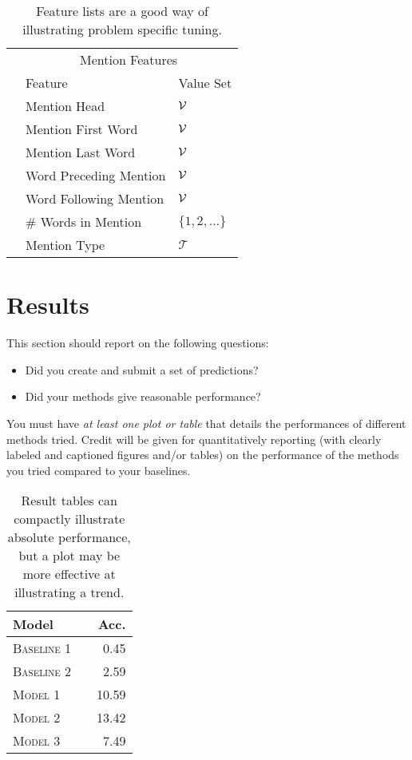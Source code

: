 \documentclass[11pt]{article}
\begin{document}
  \begin{table}
    \centering
    \begin{tabular}{@{}lll@{}}
      \toprule
      &\multicolumn{2}{c}{Mention Features  } \\
      & Feature & Value Set\\
      \midrule
      & Mention Head & $\mathcal{V}$ \\
      & Mention First Word & $\mathcal{V}$ \\
      & Mention Last Word & $\mathcal{V}$ \\
      & Word Preceding Mention & $\mathcal{V}$ \\
      & Word Following Mention & $\mathcal{V}$\\
      & \# Words in Mention & $\{1, 2, \ldots \}$ \\
      & Mention Type & $\mathcal{T}$ \\
      \bottomrule
      
    \end{tabular}
    \caption{Feature lists are a good way of illustrating problem specific tuning.}
  \end{table}



\section{Results}
This section should report on the following questions: 

\begin{itemize}
\item Did you create and submit a set of
  predictions? 
  

\item  Did your methods give reasonable performance?  
\end{itemize}

\noindent You must have \textit{at least one plot or table}
that details the performances of different methods tried. 
Credit will be given for quantitatively reporting (with clearly
labeled and captioned figures and/or tables) on the performance of the
methods you tried compared to your baselines.



\begin{table}
\centering
\begin{tabular}{llr}
 \toprule
 Model &  & Acc. \\
 \midrule
 \textsc{Baseline 1} & & 0.45\\
 \textsc{Baseline 2} & & 2.59 \\
 \textsc{Model 1} & & 10.59  \\
 \textsc{Model 2} & &13.42 \\
 \textsc{Model 3} & & 7.49\\
 \bottomrule
\end{tabular}
\caption{\label{tab:results} Result tables can compactly illustrate absolute performance, but a plot may be more effective at illustrating a trend.}
\end{table}
\end{document}
